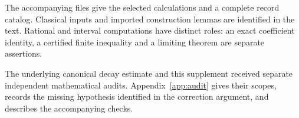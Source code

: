 The accompanying files give the selected calculations and a complete
record catalog. Classical inputs and imported construction lemmas are
identified in the text. Rational and interval computations have distinct
roles: an exact coefficient identity, a certified finite inequality and
a limiting theorem are separate assertions.

The underlying canonical decay estimate and this supplement received
separate independent mathematical audits. Appendix~\ref{app:audit} gives
their scopes, records the missing hypothesis identified in the correction
argument, and describes the accompanying checks.

